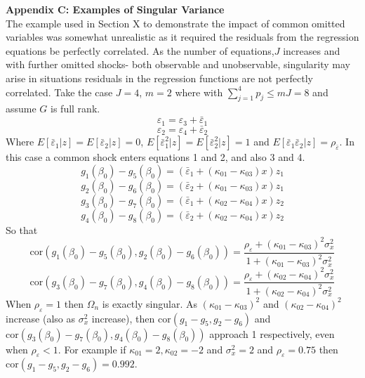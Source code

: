 \documentclass[11pt, fleqn]{article}
\begin{document}
\textbf{Appendix C: Examples of Singular Variance}\\

The example used in Section X to demonstrate the impact of common omitted variables was somewhat unrealistic as it required the residuals from the regression equations be perfectly correlated. As the number of equations,$J$ increases and with further omitted shocks- both observable and unobservable, singularity may arise in situations residuals in the regression functions are not perfectly correlated.
Take the case $J=4$, $m=2$ where with $\sum_{j=1}^4p_j \leq mJ=8$ and assume $G$ is full rank.
\begin{equation}\varepsilon_1=\varepsilon_3+\bar{\varepsilon}_1 \end{equation}
\begin{equation}\varepsilon_2=\varepsilon_4+\bar{\varepsilon}_2\end{equation}
Where $ E[\bar{\varepsilon}_1|z]= E[\bar{\varepsilon}_2|z]=0$, $E[\bar{\varepsilon}_1^2|z]=E[\bar{\varepsilon}_2^2|z]=1$ and $E[\bar{\varepsilon}_1
\bar{\varepsilon}_2|z]=\rho_{\bar{\varepsilon}}$. In this case a common shock enters equations 1 and 2, and also 3 and 4.
\begin{equation}g_1(\beta_0)-g_5(\beta_0)=(\bar{\varepsilon}_1 +(\kappa_{01}-\kappa_{03})x)z_1\end{equation}
\begin{equation} g_2(\beta_0)-g_6(\beta_0)=(\bar{\varepsilon}_2+(\kappa_{01}-\kappa_{03})x)z_1 \end{equation}
\begin{equation}g_3(\beta_0)-g_7(\beta_0)=(\bar{\varepsilon}_1 +(\kappa_{02}-\kappa_{04})x)z_2\end{equation}
\begin{equation} g_4(\beta_0)-g_8(\beta_0)=(\bar{\varepsilon}_2+(\kappa_{02}-\kappa_{04})x)z_2 \end{equation}
So that
\begin{equation} \textrm{cor}\left(g_1(\beta_0)-g_5(\beta_0),g_2(\beta_0)-g_6(\beta_0)\right)=\frac{\rho_{\varepsilon}+(\kappa_{01}-\kappa_{03})^2\sigma_x^2}
{1+(\kappa_{01}-\kappa_{03})^2\sigma_x^2}\end{equation}
\begin{equation} \textrm{cor}\left(g_3(\beta_0)-g_7(\beta_0),g_4(\beta_0)-g_8(\beta_0)\right)=\frac{\rho_{\varepsilon}+(\kappa_{02}-\kappa_{04})^2\sigma_x^2}
{1+(\kappa_{02}-\kappa_{04})^2\sigma_x^2}\end{equation}
When $\rho_{\varepsilon}=1$ then $\Omega_n$ is exactly singular. As $(\kappa_{01}-\kappa_{03})^2$ and $(\kappa_{02}-\kappa_{04})^2$ increase (also as  $\sigma_x^2$ increase), then $\textrm{cor}\left(g_1-g_5,g_2-g_6\right)$ and $\textrm{cor}\left(g_3(\beta_0)-g_7(\beta_0),g_4(\beta_0)-g_8(\beta_0)\right)$  approach 1 respectively, even when $\rho_{\varepsilon}<1$. For example if $\kappa_{01}=2,\kappa_{02}=-2$ and $\sigma_x^2=2$ and $\rho_{\varepsilon}=0.75$ then $\textrm{cor}\left(g_1-g_5,g_2-g_6\right)=0.992$. \\
\end{document}
